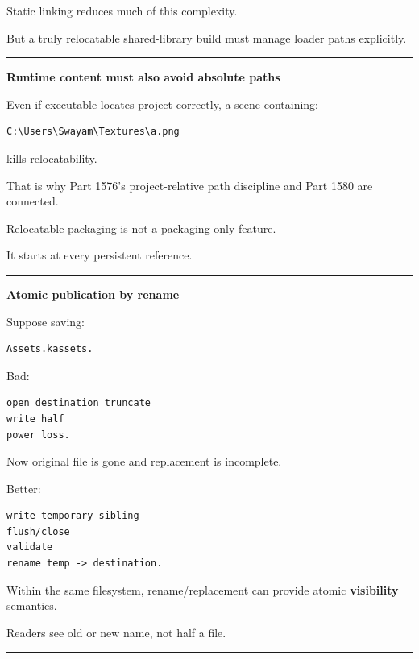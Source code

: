 Static linking reduces much of this complexity.

But a truly relocatable shared-library build must manage loader paths explicitly.

\begin{center}\rule{0.5\linewidth}{0.5pt}\end{center}

\textbf{Runtime content must also avoid absolute paths}

Even if executable locates project correctly, a scene containing:

\begin{verbatim}
C:\Users\Swayam\Textures\a.png
\end{verbatim}

kills relocatability.

That is why Part 1576's project-relative path discipline and Part 1580 are connected.

Relocatable packaging is not a packaging-only feature.

It starts at every persistent reference.

\begin{center}\rule{0.5\linewidth}{0.5pt}\end{center}

\textbf{Atomic publication by rename}

Suppose saving:

\begin{verbatim}
Assets.kassets.
\end{verbatim}

Bad:

\begin{verbatim}
open destination truncate
write half
power loss.
\end{verbatim}

Now original file is gone and replacement is incomplete.

Better:

\begin{verbatim}
write temporary sibling
flush/close
validate
rename temp -> destination.
\end{verbatim}

Within the same filesystem, rename/replacement can provide atomic \textbf{visibility} semantics.

Readers see old or new name, not half a file.

\begin{center}\rule{0.5\linewidth}{0.5pt}\end{center}

